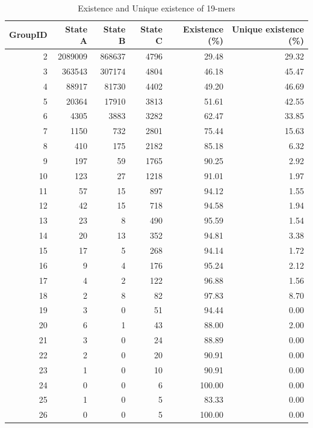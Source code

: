 \documentclass[11pt]{article}
\begin{document}
\begin{longtable}{r|r|r|r|r|r} 
\caption{Existence and Unique existence of 19-mers}\\
\toprule
\textbf{GroupID} & \textbf{State A} & \textbf{State B} & \textbf{State C} & \textbf{Existence (\%)} & \textbf{Unique existence (\%)}\\
\midrule
\endhead
    2     & 2089009 & 868637 & 4796  & 29.48 & 29.32 \\
    3     & 363543 & 307174 & 4804  & 46.18 & 45.47 \\
    4     & 88917 & 81730 & 4402  & 49.20 & 46.69 \\
    5     & 20364 & 17910 & 3813  & 51.61 & 42.55 \\
    6     & 4305  & 3883  & 3282  & 62.47 & 33.85 \\
    7     & 1150  & 732   & 2801  & 75.44 & 15.63 \\
    8     & 410   & 175   & 2182  & 85.18 & 6.32 \\
    9     & 197   & 59    & 1765  & 90.25 & 2.92 \\
    10    & 123   & 27    & 1218  & 91.01 & 1.97 \\
    11    & 57    & 15    & 897   & 94.12 & 1.55 \\
    12    & 42    & 15    & 718   & 94.58 & 1.94 \\
    13    & 23    & 8     & 490   & 95.59 & 1.54 \\
    14    & 20    & 13    & 352   & 94.81 & 3.38 \\
    15    & 17    & 5     & 268   & 94.14 & 1.72 \\
    16    & 9     & 4     & 176   & 95.24 & 2.12 \\
    17    & 4     & 2     & 122   & 96.88 & 1.56 \\
    18    & 2     & 8     & 82    & 97.83 & 8.70 \\
    19    & 3     & 0     & 51    & 94.44 & 0.00 \\
    20    & 6     & 1     & 43    & 88.00 & 2.00 \\
    21    & 3     & 0     & 24    & 88.89 & 0.00 \\
    22    & 2     & 0     & 20    & 90.91 & 0.00 \\
    23    & 1     & 0     & 10    & 90.91 & 0.00 \\
    24    & 0     & 0     & 6     & 100.00 & 0.00 \\
    25    & 1     & 0     & 5     & 83.33 & 0.00 \\
    26    & 0     & 0     & 5     & 100.00 & 0.00 \\

\end{longtable}
\end{document}
